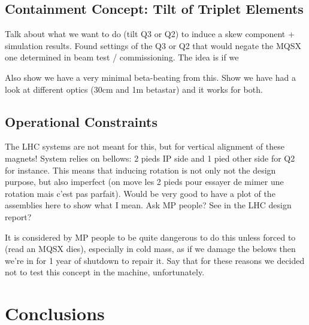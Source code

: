 \subsection{Containment Concept: Tilt of Triplet Elements}

Talk about what we want to do (tilt Q3 or Q2) to induce a skew component + simulation results.
Found settings of the Q3 or Q2 that would negate the MQSX one determined in beam test / commissioning.
The idea is if we 

Also show we have a very minimal beta-beating from this.
Show we have had a look at different optics (30cm and 1m betastar) and it works for both.

\subsection{Operational Constraints}

The LHC systems are not meant for this, but for vertical alignment of these magnets!
System relies on bellows: 2 pieds IP side and 1 pied other side for Q2 for instance.
This means that inducing rotation is not only not the design purpose, but also imperfect (on move les 2 pieds pour essayer de mimer une rotation mais c'est pas parfait).
Would be very good to have a plot of the assemblies here to show what I mean. Ask MP people? See in the LHC design report?

It is considered by MP people to be quite dangerous to do this unless forced to (read an MQSX dies), especially in cold mass, as if we damage the belows then we're in for 1 year of shutdown to repair it.
Say that for these reasons we decided not to test this concept in the machine, unfortunately.


\section{Conclusions}

